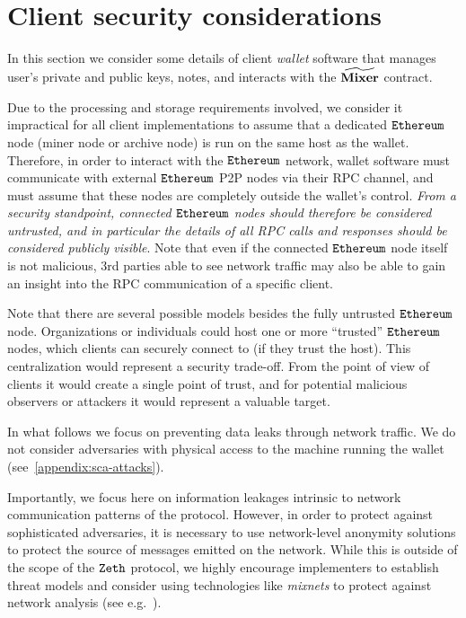 
\section{Client security considerations}\label{client-security}

In this section we consider some details of client \emph{wallet} software that manages user's private and public keys, \zeth{} notes, and interacts with the $\widetilde{\mathbf{Mixer}}$ contract.

Due to the processing and storage requirements involved, we consider it impractical for all \zeth{} client implementations to assume that a dedicated $\texttt{Ethereum}{}$ node (miner node or archive node) is run on the same host as the wallet. Therefore, in order to interact with the $\texttt{Ethereum}{}$ network, wallet software must communicate with external $\texttt{Ethereum}{}$ P2P nodes via their RPC channel, and must assume that these nodes are completely outside the wallet's control. \emph{From a security standpoint, connected $\texttt{Ethereum}{}$ nodes should therefore be considered untrusted, and in particular the details of all RPC calls and responses should be considered publicly visible}. Note that even if the connected $\texttt{Ethereum}{}$ node itself is not malicious, 3rd parties able to see network traffic may also be able to gain an insight into the RPC communication of a specific \zeth{} client.

\begin{notebox}
    Note that there are several possible models besides the fully untrusted $\texttt{Ethereum}{}$ node. Organizations or individuals could host one or more ``trusted'' $\texttt{Ethereum}{}$ nodes, which clients can securely connect to (if they trust the host). This centralization would represent a security trade-off. From the point of view of clients it would create a single point of trust, and for potential malicious observers or attackers it would represent a valuable target.
\end{notebox}

In what follows we focus on preventing data leaks through network traffic. We do not consider adversaries with physical access to the machine running the wallet (see~\cref{appendix:sca-attacks}).

\begin{notebox}
    Importantly, we focus here on information leakages intrinsic to network communication patterns of the \zeth{} protocol. However, in order to protect against sophisticated adversaries, it is necessary to use network-level anonymity solutions to protect the source of messages emitted on the network. While this is outside of the scope of the $\texttt{Zeth}{}$ protocol, we highly encourage implementers to establish threat models and consider using technologies like \emph{mixnets} to protect against network analysis (see e.g.~\cite{DBLP:conf/uss/PiotrowskaHEMD17,DBLP:conf/sp/DanezisG09}).
\end{notebox}

